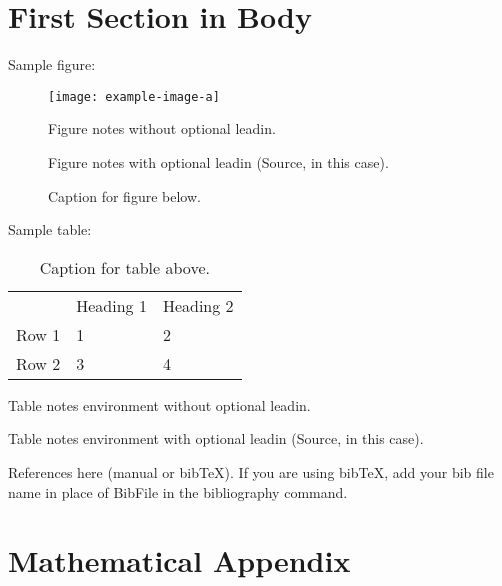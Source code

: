 \documentclass[AER,
finalmode,  %
]{AEA}
\begin{document}
\section{First Section in Body}

Sample figure:

\begin{figure}[ht]

    \texttt{[image: example-image-a]}
    
    \caption{Caption for figure below.}
    \begin{figurenotes}
        Figure notes without optional leadin.
    \end{figurenotes}
    \begin{figurenotes}[Source]
        Figure notes with optional leadin (Source, in this case).
    \end{figurenotes}
\end{figure}

Sample table:

\begin{table}[ht]
    \caption{Caption for table above.}
    
    \begin{tabular}{lll}
              & Heading 1 & Heading 2 \\ 
        Row 1 & 1         & 2         \\ 
        Row 2 & 3         & 4         %
    \end{tabular}
    \begin{tablenotes}
        Table notes environment without optional leadin.
    \end{tablenotes}
    \begin{tablenotes}[Source]
        Table notes environment with optional leadin (Source, in this case).
    \end{tablenotes}
\end{table}

References here (manual or bibTeX). If you are using bibTeX, add your bib file 
name in place of BibFile in the bibliography command.



\appendix

\section{Mathematical Appendix}
\end{document}
